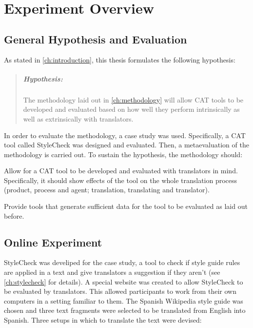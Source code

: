 
\chapter{Experiment Overview} %
\label{ch:experiment}


\section{General Hypothesis and Evaluation}

\noindent As stated in \autoref{ch:introduction}, this thesis formulates the following hypothesis:

\begin{quote}
\paragraph{Hypothesis:} The methodology laid out in \autoref{ch:methodology} will allow \ac{CAT} tools to be developed and evaluated based on how well they perform intrinsically as well as extrinsically with translators.
\end{quote}

\noindent In order to evaluate the methodology, a case study was used. Specifically, a \ac{CAT} tool called StyleCheck was designed and evaluated. Then, a metaevaluation of the methodology is carried out. To sustain the hypothesis, the methodology should:

\begin{aenumerate}
    \item Allow for a \ac{CAT} tool to be developed and evaluated with translators in mind. Specifically, it should show effects of the tool on the whole translation process (product, process and agent; translation, translating and translator). 
    \item Provide tools that generate sufficient data for the tool to be evaluated as laid out before.
\end{aenumerate}


\section{Online Experiment}
\label{sec:online}

\noindent StyleCheck was develiped for the case study, a tool to check if style guide rules are applied in a text and give translators a suggestion if they aren't (see \autoref{ch:stylecheck} for details). A special website was created to allow StyleCheck to be evaluated by translators. This allowed participants to work from their own computers in a setting familiar to them. The Spanish Wikipedia style guide was chosen and three text fragments were selected to be translated from English into Spanish. Three setups in which to translate the text were devised:

